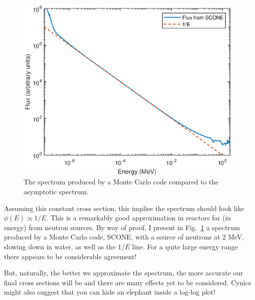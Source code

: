 \begin{figure}[h!]
  \centering
  \includegraphics[scale=0.70]{./Figures/P2/fermi.eps} 
  \caption{The spectrum produced by a Monte Carlo code compared to the asymptotic spectrum.} 
  \label{fig:fermi}
\end{figure}

Assuming this constant cross section, this implies the spectrum should look like $\phi(E)\propto 1/E$. This is a remarkably good approximation in reactors far (in energy) from neutron sources. By way of proof, I present in Fig.~\ref{fig:fermi} a spectrum produced by a Monte Carlo code, SCONE, with a source of neutrons at 2 MeV, slowing down in water, as well as the $1/E$ line. For a quite large energy range there appears to be considerable agreement!


But, naturally, the better we approximate the spectrum, the more accurate our final cross sections will be and there are many effects yet to be considered. Cynics might also suggest that you can hide an elephant inside a log-log plot!

